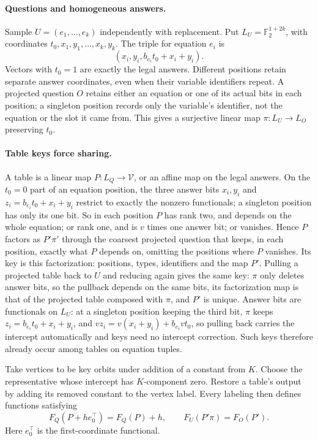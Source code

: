 \documentclass[11pt]{article}
\newcommand{\F}{\mathbb F}
\begin{document}
\paragraph{Questions and homogeneous answers.}
Sample $U=(e_1,\ldots,e_k)$ independently with replacement. Put
$L_U=\F_2^{1+2k}$, with coordinates $t_0,x_1,y_1,\ldots,x_k,y_k$.
The triple for equation $e_i$ is
\[
 (x_i,y_i,b_{e_i}t_0+x_i+y_i).
\]
Vectors with $t_0=1$ are exactly the legal answers. Different positions
retain separate answer coordinates, even when their variable identifiers
repeat. A projected question $O$ retains either an equation or one of its
actual bits in each position; a singleton position records only the
variable's identifier, not the equation or the slot it came from. This gives a surjective linear map
$\pi:L_U\to L_O$ preserving $t_0$.

\paragraph{Table keys force sharing.}
A table is a linear map $P:L_Q\to\mathcal V$, or an affine map on the
legal answers. On the $t_0=0$ part of an equation position, the three
answer bits $x_i,y_i$ and $z_i=b_{e_i}t_0+x_i+y_i$ restrict to exactly the
nonzero functionals; a singleton position has only its one bit. So in each position $P$ has rank two, and depends on
the whole equation; or rank one, and is $v$ times one answer bit; or
vanishes. Hence $P$
factors as $P'\pi'$ through the coarsest projected question that keeps,
in each position, exactly what $P$ depends on, omitting the positions where
$P$ vanishes. Its key is this
factorization: positions, types, identifiers and the map $P'$. Pulling a
projected table back to $U$ and reducing again gives the same key: $\pi$
only deletes answer bits, so the pullback depends on the same bits, its
factorization map is that of the projected table composed with $\pi$, and
$P'$ is unique. Answer bits are functionals on $L_U$: at a singleton
position keeping the third bit, $\pi$ keeps $z_i=b_{e_i}t_0+x_i+y_i$, and
$vz_i=v(x_i+y_i)+b_{e_i}vt_0$, so pulling back carries the intercept
automatically and keys need no intercept correction. Such keys therefore already occur among
tables on equation tuples.

Take vertices to be key orbits under addition of a constant from $K$.
Choose the representative whose intercept has $K$-component zero. Restore
a table's output by adding its removed constant to the vertex label.
Every labeling then defines functions satisfying
\begin{equation}\label{eq:fold-share}
 F_Q(P+h e_0^\top)=F_Q(P)+h,\qquad
 F_U(P'\pi)=F_O(P').
\end{equation}
Here $e_0^\top$ is the first-coordinate functional.
\end{document}
